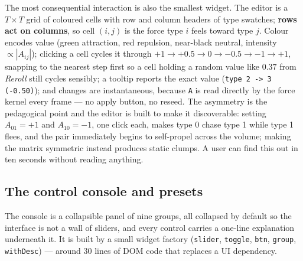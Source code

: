 \documentclass[10pt,a4paper]{article}
\newcommand{\code}[1]{\texttt{\small #1}}
\begin{document}
The most consequential interaction is also the smallest widget. The editor is a $T\times T$ grid of
coloured cells with row and column headers of type swatches; \textbf{rows act on columns}, so cell $(i,j)$
is the force type $i$ feels toward type $j$. Colour encodes value (green attraction, red repulsion,
near-black neutral, intensity $\propto|A_{ij}|$); clicking a cell cycles it through
$+1\to+0.5\to0\to-0.5\to-1\to+1$, snapping to the nearest step first so a cell holding a random value like
$0.37$ from \emph{Reroll} still cycles sensibly; a tooltip reports the exact value
(\code{type 2 -> 3 (-0.50)}); and changes are instantaneous, because \code{A} is read directly by the force
kernel every frame --- no apply button, no reseed. The asymmetry is the pedagogical point and the editor is
built to make it discoverable: setting $A_{01}=+1$ and $A_{10}=-1$, one click each, makes type 0 chase type
1 while type 1 flees, and the pair immediately begins to self-propel across the volume; making the matrix
symmetric instead produces static clumps. A user can find this out in ten seconds without reading anything.

\subsection{The control console and presets}

The console is a collapsible panel of nine groups, all collapsed by default so the interface is not a wall
of sliders, and every control carries a one-line explanation underneath it. It is built by a small widget
factory (\code{slider}, \code{toggle}, \code{btn}, \code{group}, \code{withDesc}) --- around 30 lines of DOM
code that replaces a UI dependency.
\end{document}
